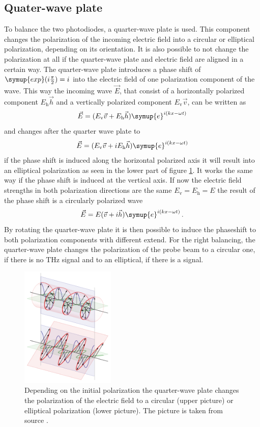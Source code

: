 \subsection{Quater-wave plate}
\label{sec:qwp}
To balance the two photodiodes, a quarter-wave plate is used.
This component changes the polarization of the incoming electric field into a circular or elliptical polarization, depending on its orientation.
It is also possible to not change the polarization at all if the quarter-wave plate and electric field are aligned in a certain way.
The quarter-wave plate introduces a phase shift of $\symup{exp}(i\frac{\pi}{2}) = i$ into the electric field of one polarization component of the wave.
This way the incoming wave $\vec{E}$, that consist of a horizontally polarized component $E_\text{h}\vec{h}$ and a vertically polarized component $E_\text{v}\vec{v}$, can be written as
\begin{equation}
    \vec{E} = (E_\text{v}\vec{v} + E_\text{h}\vec{h})\symup{e}^{i(kx-\omega t)}
\end{equation}
and changes after the quarter wave plate to 
\begin{equation}
    \vec{E} = (E_\text{v}\vec{v} + i E_\text{h}\vec{h})\symup{e}^{i(kx-\omega t)}
\end{equation}
if the phase shift is induced along the horizontal polarized axis it will result into an elliptical polarization as seen in the lower part of figure \ref{fig:qwp}.
It works the same way if the phase shift is induced at the vertical axis.
If now the electric field strengths in both polarization directions are the same $E_\text{v} = E_\text{h} = E$ the result of the phase shift is a circularly polarized wave
\begin{equation}
    \vec{E} = E(\vec{v} + i\vec{h})\symup{e}^{i(kx-\omega t)} \, .
\end{equation}
By rotating the quarter-wave plate it is then possible to induce the phaseshift to both polarization components with different extend.
For the right balancing, the quarter-wave plate changes the polarization of the probe beam to a circular one, if there is no $\si{\tera\hertz}$ signal and to an elliptical, if there is a signal.
\begin{figure}
    \centering
    \includegraphics[width=0.4\textwidth]{refferenced_pic/qwp.png}
    \caption{Depending on the initial polarization the quarter-wave plate changes the polarization of the electric field to a circular (upper picture) or elliptical polarization (lower picture).
    The picture is taken from source \cite{qwp}.}
    \label{fig:qwp}
\end{figure}
\FloatBarrier
